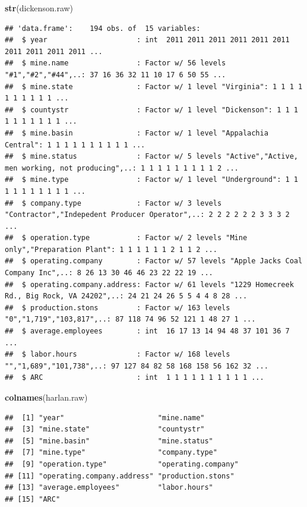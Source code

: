 \documentclass[12pt,]{article}
\newenvironment{Shaded}{\begin{snugshade}}{\end{snugshade}}
\newcommand{\KeywordTok}[1]{\textcolor[rgb]{0.13,0.29,0.53}{\textbf{#1}}}
\newcommand{\NormalTok}[1]{#1}
\begin{document}
\begin{Shaded}
\begin{Highlighting}[]
\KeywordTok{str}\NormalTok{(dickenson.raw)}
\end{Highlighting}
\end{Shaded}

\begin{verbatim}
## 'data.frame':    194 obs. of  15 variables:
##  $ year                     : int  2011 2011 2011 2011 2011 2011 2011 2011 2011 2011 ...
##  $ mine.name                : Factor w/ 56 levels "#1","#2","#44",..: 37 16 36 32 11 10 17 6 50 55 ...
##  $ mine.state               : Factor w/ 1 level "Virginia": 1 1 1 1 1 1 1 1 1 1 ...
##  $ countystr                : Factor w/ 1 level "Dickenson": 1 1 1 1 1 1 1 1 1 1 ...
##  $ mine.basin               : Factor w/ 1 level "Appalachia Central": 1 1 1 1 1 1 1 1 1 1 ...
##  $ mine.status              : Factor w/ 5 levels "Active","Active, men working, not producing",..: 1 1 1 1 1 1 1 1 1 2 ...
##  $ mine.type                : Factor w/ 1 level "Underground": 1 1 1 1 1 1 1 1 1 1 ...
##  $ company.type             : Factor w/ 3 levels "Contractor","Indepedent Producer Operator",..: 2 2 2 2 2 2 3 3 3 2 ...
##  $ operation.type           : Factor w/ 2 levels "Mine only","Preparation Plant": 1 1 1 1 1 1 2 1 1 2 ...
##  $ operating.company        : Factor w/ 57 levels "Apple Jacks Coal Company Inc",..: 8 26 13 30 46 46 23 22 22 19 ...
##  $ operating.company.address: Factor w/ 61 levels "1229 Homecreek Rd., Big Rock, VA 24202",..: 24 21 24 26 5 5 4 4 8 28 ...
##  $ production.stons         : Factor w/ 163 levels "0","1,719","103,817",..: 87 118 74 96 52 121 1 48 27 1 ...
##  $ average.employees        : int  16 17 13 14 94 48 37 101 36 7 ...
##  $ labor.hours              : Factor w/ 168 levels "","1,689","101,738",..: 97 127 84 82 58 168 158 56 162 32 ...
##  $ ARC                      : int  1 1 1 1 1 1 1 1 1 1 ...
\end{verbatim}

\begin{Shaded}
\begin{Highlighting}[]
\KeywordTok{colnames}\NormalTok{(harlan.raw)}
\end{Highlighting}
\end{Shaded}

\begin{verbatim}
##  [1] "year"                      "mine.name"                
##  [3] "mine.state"                "countystr"                
##  [5] "mine.basin"                "mine.status"              
##  [7] "mine.type"                 "company.type"             
##  [9] "operation.type"            "operating.company"        
## [11] "operating.company.address" "production.stons"         
## [13] "average.employees"         "labor.hours"              
## [15] "ARC"
\end{verbatim}
\end{document}
